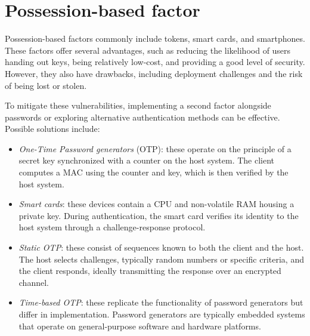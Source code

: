 \section{Possession-based factor}

Possession-based factors commonly include tokens, smart cards, and smartphones. 
These factors offer several advantages, such as reducing the likelihood of users handing out keys, being relatively low-cost, and providing a good level of security. 
However, they also have drawbacks, including deployment challenges and the risk of being lost or stolen.

To mitigate these vulnerabilities, implementing a second factor alongside passwords or exploring alternative authentication methods can be effective.
Possible solutions include:
\begin{itemize}
    \item \textit{One-Time Password generators} (OTP): these operate on the principle of a secret key synchronized with a counter on the host system. 
        The client computes a MAC using the counter and key, which is then verified by the host system. 
    \item \textit{Smart cards}: these devices contain a CPU and non-volatile RAM housing a private key. 
        During authentication, the smart card verifies its identity to the host system through a challenge-response protocol. 
    \item \textit{Static OTP}: these consist of sequences known to both the client and the host. 
        The host selects challenges, typically random numbers or specific criteria, and the client responds, ideally transmitting the response over an encrypted channel. 
    \item \textit{Time-based OTP}: these replicate the functionality of password generators but differ in implementation. 
        Password generators are typically embedded systems that operate on general-purpose software and hardware platforms.
\end{itemize}